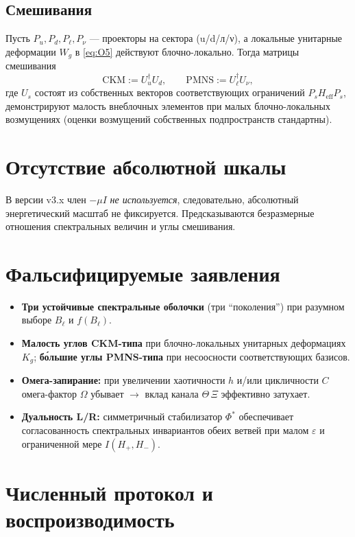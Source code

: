 \documentclass[a4paper,12pt]{article}
\begin{document}
\subsection*{Смешивания}
Пусть $P_u,P_d,P_\ell,P_\nu$ --- проекторы на сектора (u/d/л/ν), а локальные унитарные деформации $W_g$ в \eqref{eq:O5} действуют блочно-локально.
Тогда матрицы смешивания
\begin{equation}
\mathrm{CKM}:=U_u^\dagger U_d, \qquad \mathrm{PMNS}:=U_\ell^\dagger U_\nu,
\end{equation}
где $U_s$ состоят из собственных векторов соответствующих ограничений $P_s H_{\mathrm{eff}} P_s$, демонстрируют малость внеблочных элементов при малых блочно-локальных возмущениях (оценки возмущений собственных подпространств стандартны).

\section{Отсутствие абсолютной шкалы}
В версии v3.x член $-\mu I$ \emph{не используется}, следовательно, абсолютный энергетический масштаб не фиксируется.
Предсказываются безразмерные отношения спектральных величин и углы смешивания.

\section{Фальсифицируемые заявления}
\begin{itemize}
\item \textbf{Три устойчивые спектральные оболочки} (три ``поколения'') при разумном выборе $B_\ell$ и $f(B_\ell)$.
\item \textbf{Малость углов CKM-типа} при блочно-локальных унитарных деформациях $K_g$; \textbf{б\'ольшие углы PMNS-типа} при несоосности соответствующих базисов.
\item \textbf{Омега-запирание:} при увеличении хаотичности $h$ и/или цикличности $C$ омега-фактор $\Omega$ убывает $\to$ вклад канала $\Theta\,\Xi$ эффективно затухает.
\item \textbf{Дуальность L/R:} симметричный стабилизатор $\Phi^\ast$ обеспечивает согласованность спектральных инвариантов обеих ветвей при малом $\varepsilon$ и ограниченной мере $I(H_+,H_-)$.
\end{itemize}

\section{Численный протокол и воспроизводимость}
\end{document}
